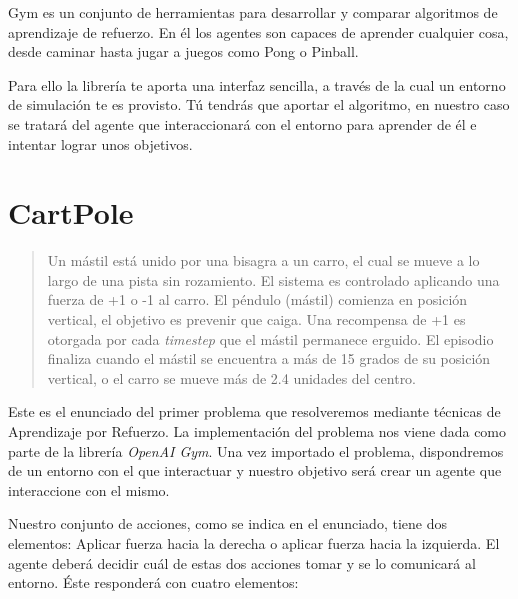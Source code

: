 Gym es un conjunto de herramientas para desarrollar y comparar algoritmos de aprendizaje de refuerzo. En él los agentes son capaces de aprender cualquier cosa, desde caminar hasta jugar a juegos como Pong o Pinball.

Para ello la librería te aporta una interfaz sencilla, a través de la cual un entorno de simulación te es provisto. Tú tendrás que aportar el algoritmo, en nuestro caso se tratará del agente que interaccionará con el entorno para aprender de él e intentar lograr unos objetivos.

\section{CartPole}
\begin{quote}
    Un mástil está unido por una bisagra a un carro, el cual se mueve a lo largo de una pista sin rozamiento. El sistema es controlado aplicando una fuerza de +1 o -1 al carro. El péndulo (mástil) comienza en posición vertical, el objetivo es prevenir que caiga. Una recompensa de +1 es otorgada por cada \textit{timestep} que el mástil permanece erguido. El episodio finaliza cuando el mástil se encuentra a más de 15 grados de su posición vertical, o el carro se mueve más de 2.4 unidades del centro.
\end{quote}

Este es el enunciado del primer problema que resolveremos mediante técnicas de Aprendizaje por Refuerzo. La implementación del problema nos viene dada como parte de la librería \textit{OpenAI Gym}. Una vez importado el problema, dispondremos de un entorno con el que interactuar y nuestro objetivo será crear un agente que interaccione con el mismo.

Nuestro conjunto de acciones, como se indica en el enunciado, tiene dos elementos: Aplicar fuerza hacia la derecha o aplicar fuerza hacia la izquierda. El agente deberá decidir cuál de estas dos acciones tomar y se lo comunicará al entorno. Éste responderá con cuatro elementos:

